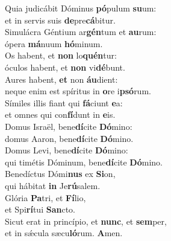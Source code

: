 \evenverse Quia judicábit Dóminus \textbf{pó}pulum \textbf{su}um:~\*\\
\evenverse et in servis suis \textbf{de}pre\textbf{cá}bitur.\\
\oddverse Simulácra Géntium ar\textbf{gén}tum et \textbf{au}rum:~\*\\
\oddverse ópera \textbf{má}nuum \textbf{hó}minum.\\
\evenverse Os habent, et \textbf{non} lo\textbf{quén}tur:~\*\\
\evenverse óculos habent, et \textbf{non} vi\textbf{dé}bunt.\\
\oddverse Aures habent, \textbf{et} non \textbf{áu}dient:~\*\\
\oddverse neque enim est spíritus in \textbf{o}re i\textbf{psó}rum.\\
\evenverse Símiles illis fiant qui \textbf{fá}ciunt \textbf{e}a:~\*\\
\evenverse et omnes qui con\textbf{fí}dunt in \textbf{e}is.\\
\oddverse Domus Israël, bene\textbf{dí}cite \textbf{Dó}mino:~\*\\
\oddverse domus Aaron, bene\textbf{dí}cite \textbf{Dó}mino.\\
\evenverse Domus Levi, bene\textbf{dí}cite \textbf{Dó}mino:~\*\\
\evenverse qui timétis Dóminum, bene\textbf{dí}cite \textbf{Dó}mino.\\
\oddverse Benedíctus Dómi\textbf{nus} ex \textbf{Si}on,~\*\\
\oddverse qui hábitat \textbf{in} Je\textbf{rú}salem.\\
\evenverse Glória \textbf{Pa}tri, et \textbf{Fí}lio,~\*\\
\evenverse et Spi\textbf{rí}tui \textbf{San}cto.\\
\oddverse Sicut erat in princípio, et \textbf{nunc}, et \textbf{sem}per,~\*\\
\oddverse et in sǽcula sæcu\textbf{ló}rum. \textbf{A}men.\\
